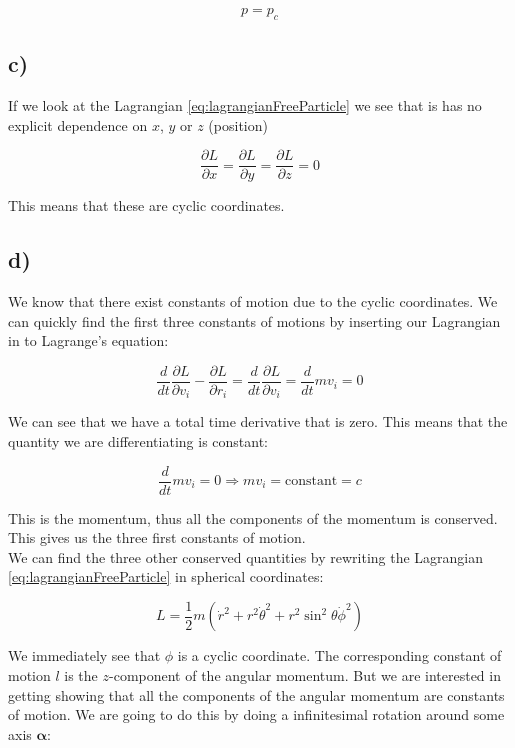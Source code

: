 \documentclass[a4paper,norsk, 10pt]{article}
\begin{document}
$$
p = p_c
$$

\subsection*{c)}

If we look at the Lagrangian \eqref{eq:lagrangianFreeParticle} we see that is has no explicit dependence on $x$, $y$ or $z$ (position)

$$
\frac{\partial L}{\partial x} = \frac{\partial L}{\partial y} = \frac{\partial L}{\partial z} = 0
$$

This means that these are cyclic coordinates.

\subsection*{d)}

We know that there exist constants of motion due to the cyclic coordinates. We can quickly find the first three constants of motions by inserting our Lagrangian in to Lagrange's equation:

\begin{equation}
\frac{d}{dt}\frac{\partial L}{\partial v_i} - \frac{\partial L}{\partial r_i} = \frac{d}{dt}\frac{\partial L}{\partial v_i} = \frac{d}{dt} mv_i = 0
\end{equation}

We can see that we have a total time derivative that is zero. This means that the quantity we are differentiating is constant:

\begin{equation}
\frac{d}{dt} mv_i = 0 \Rightarrow mv_i = \text{constant} = c
\end{equation}

This is the momentum, thus all the components of the momentum is conserved. This gives us the three first constants of motion.\\

We can find the three other conserved quantities by rewriting the Lagrangian \eqref{eq:lagrangianFreeParticle} in spherical coordinates:

\begin{equation}
L = \frac{1}{2}m(\dot{r}^2 + r^2\dot{\theta}^2 +r^2\sin^2\theta\dot{\phi}^2)
\label{eq:lagrangianSpherical}
\end{equation}

We immediately see that $\phi$ is a cyclic coordinate. The corresponding constant of motion $l$ is the $z$-component of the angular momentum. But we are interested in getting showing that all the components of the angular momentum are constants of motion. We are going to do this by doing a infinitesimal rotation around some axis $\mathbf{\alpha}$:
\end{document}
